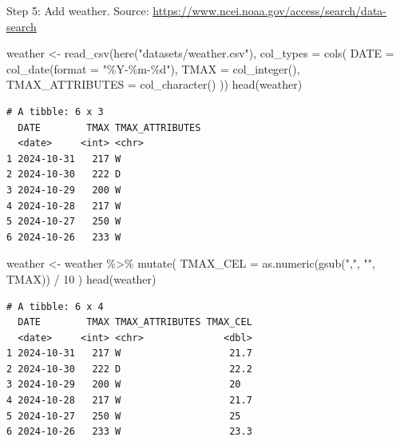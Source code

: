 \documentclass[
  letterpaper,
  DIV=11,
  numbers=noendperiod]{scrartcl}
\newenvironment{Shaded}{\begin{snugshade}}{\end{snugshade}}
\newcommand{\AttributeTok}[1]{\textcolor[rgb]{0.40,0.45,0.13}{#1}}
\newcommand{\DecValTok}[1]{\textcolor[rgb]{0.68,0.00,0.00}{#1}}
\newcommand{\FunctionTok}[1]{\textcolor[rgb]{0.28,0.35,0.67}{#1}}
\newcommand{\NormalTok}[1]{\textcolor[rgb]{0.00,0.23,0.31}{#1}}
\newcommand{\OtherTok}[1]{\textcolor[rgb]{0.00,0.23,0.31}{#1}}
\newcommand{\SpecialCharTok}[1]{\textcolor[rgb]{0.37,0.37,0.37}{#1}}
\newcommand{\StringTok}[1]{\textcolor[rgb]{0.13,0.47,0.30}{#1}}
\begin{document}
Step 5: Add weather. Source:
\href{https://www.ncei.noaa.gov/access/search/data-search/daily-summaries?bbox=33.014,-117.462,32.418,-116.866&pageNum=1}{https://www.ncei.noaa.gov/access/search/data-search}

\begin{Shaded}
\begin{Highlighting}[]
\NormalTok{weather }\OtherTok{\textless{}{-}} \FunctionTok{read\_csv}\NormalTok{(}\FunctionTok{here}\NormalTok{(}\StringTok{"datasets/weather.csv"}\NormalTok{), }\AttributeTok{col\_types =} \FunctionTok{cols}\NormalTok{(}
   \AttributeTok{DATE =} \FunctionTok{col\_date}\NormalTok{(}\AttributeTok{format =} \StringTok{"\%Y{-}\%m{-}\%d"}\NormalTok{),  }
  \AttributeTok{TMAX =} \FunctionTok{col\_integer}\NormalTok{(),}
  \AttributeTok{TMAX\_ATTRIBUTES =} \FunctionTok{col\_character}\NormalTok{()}
\NormalTok{))}
\FunctionTok{head}\NormalTok{(weather)}
\end{Highlighting}
\end{Shaded}

\begin{verbatim}
# A tibble: 6 x 3
  DATE        TMAX TMAX_ATTRIBUTES
  <date>     <int> <chr>          
1 2024-10-31   217 W              
2 2024-10-30   222 D              
3 2024-10-29   200 W              
4 2024-10-28   217 W              
5 2024-10-27   250 W              
6 2024-10-26   233 W              
\end{verbatim}

\begin{Shaded}
\begin{Highlighting}[]
\NormalTok{weather }\OtherTok{\textless{}{-}}\NormalTok{ weather }\SpecialCharTok{\%\textgreater{}\%}
  \FunctionTok{mutate}\NormalTok{(}
    \AttributeTok{TMAX\_CEL =} \FunctionTok{as.numeric}\NormalTok{(}\FunctionTok{gsub}\NormalTok{(}\StringTok{","}\NormalTok{, }\StringTok{""}\NormalTok{, TMAX)) }\SpecialCharTok{/} \DecValTok{10}
\NormalTok{  )}
\FunctionTok{head}\NormalTok{(weather)}
\end{Highlighting}
\end{Shaded}

\begin{verbatim}
# A tibble: 6 x 4
  DATE        TMAX TMAX_ATTRIBUTES TMAX_CEL
  <date>     <int> <chr>              <dbl>
1 2024-10-31   217 W                   21.7
2 2024-10-30   222 D                   22.2
3 2024-10-29   200 W                   20  
4 2024-10-28   217 W                   21.7
5 2024-10-27   250 W                   25  
6 2024-10-26   233 W                   23.3
\end{verbatim}
\end{document}
